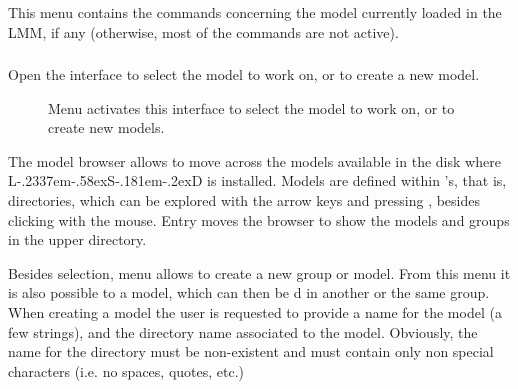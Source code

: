 \documentclass [11pt,a4paper] {book}
\def\LsD{{L\kern-.2337em\lower-.58ex\hbox{S}\kern-.181em\lower-.2ex\hbox{D}}\xspace}
\begin{document}
This menu contains the commands concerning the model currently loaded in the LMM, if any (otherwise, most of the commands are not active).

\subsubsection{}

Open the interface to select the model to work on, or to create a new model.

\begin{figure}[ht]
  \centering
  \caption{Menu  activates this interface to select the model to work on, or to create new models.}
  \label{fig:browsemodels}
\end{figure}

The model browser allows to move across the models available in the disk where \LsD is installed. Models are defined within 's, that is, directories, which can be explored with the arrow keys and pressing , besides clicking with the mouse. Entry  moves the browser to show the models and groups in the upper directory.

Besides selection, menu  allows to create a new group or model. From this menu it is also possible to  a model, which can then be d in another or the same group. When creating a model the user is requested to provide a name for the model (a few strings), and the directory name associated to the model. Obviously, the name for the directory must be non-existent and must contain only non special characters (i.e. no spaces, quotes, etc.)

\subsubsection{}
\end{document}
